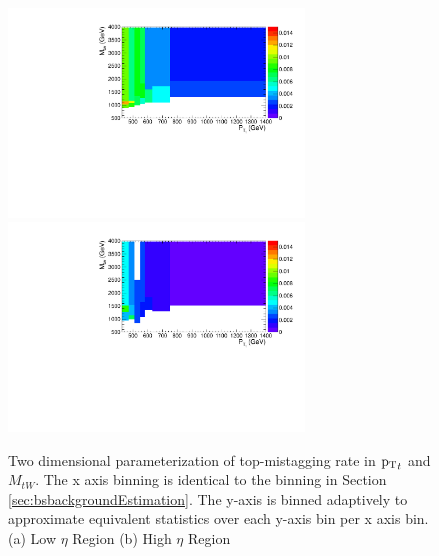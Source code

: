 \begin{figure}[htcb]
\begin{center}
\includegraphics[width=0.7\textwidth]{AN-14-049/figs/TagrateEta1SB2dSB1.pdf}\\
\includegraphics[width=0.7\textwidth]{AN-14-049/figs/TagrateEta2SB2dSB1.pdf}
\caption{
Two dimensional parameterization of top-mistagging rate in $\mathrm{p_{T}}_{t}$ and $M_{tW}$.  The x axis binning is identical to the binning in Section \ref{sec:bsbackgroundEstimation}.  
The y-axis is binned adaptively to approximate equivalent statistics over each y-axis bin per x axis bin. 
(a) Low $\eta$ Region
(b) High $\eta$ Region
}
\label{figs:bssb2deta}
\end{center}
\end{figure}

